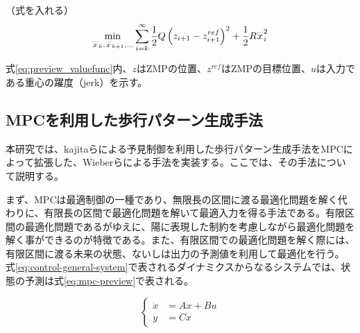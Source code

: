 （式を入れる）
\begin{equation}
  \min_{{\buildrel\ldots\over{x}}_{k},{\buildrel\ldots\over{x}}_{k+1},\ldots}\sum_{i=k}^{\infty}{1\over 2}Q\left(z_{i+1}-z_{i+1}^{ref}\right)^{2}+{1\over 2}R{\buildrel\ldots\over{x}}_{i}^{2}
  \label{eq:preview_valuefunc}
\end{equation}

式\eqref{eq:preview_valuefunc}内、$z$はZMPの位置、$z^{ref}$はZMPの目標位置、$u$は入力である重心の躍度（jerk）を示す。

\subsection{MPCを利用した歩行パターン生成手法}
本研究では、kajitaらによる予見制御を利用した歩行パターン生成手法\cite{PREVIEW}をMPCによって拡張した、Wieberらによる手法\cite{WIEBER}を実装する。ここでは、その手法\cite{WIEBER}について説明する。

まず、MPCは最適制御の一種であり、無限長の区間に渡る最適化問題を解く代わりに、有限長の区間で最適化問題を解いて最適入力を得る手法である。有限区間の最適化問題であるがゆえに、陽に表現した制約を考慮しながら最適化問題を解く事ができるのが特徴である。また、有限区間での最適化問題を解く際には、有限区間に渡る未来の状態、ないしは出力の予測値を利用して最適化を行う。
式\eqref{eq:control-general-system}で表されるダイナミクスからなるシステムでは、状態の予測は式\eqref{eq:mpc-preview}で表される。

\begin{equation}
  \begin{cases}
    \dot{x} & = Ax + Bu \\
    y       & = Cx
  \end{cases}
  \label{eq:control-general-system}
\end{equation}


